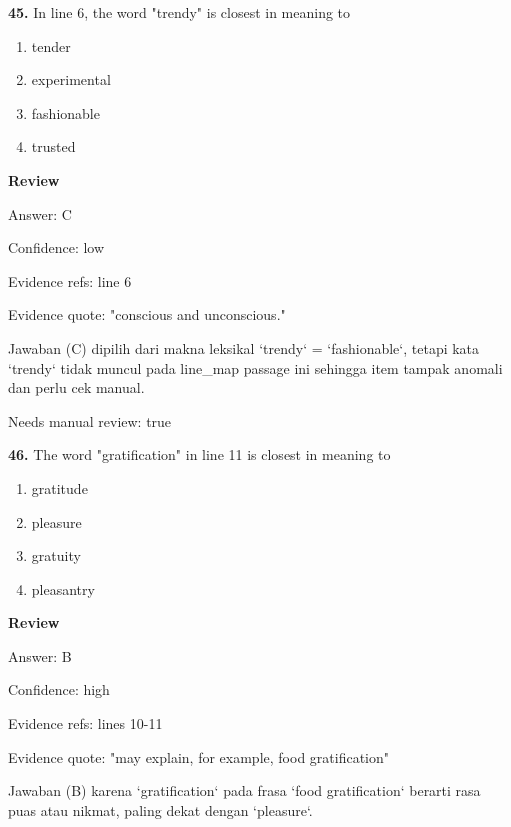 \documentclass[12pt]{article}
\begin{document}
\endgroup
\par
\vspace{0.25\baselineskip}
\noindent\textbf{45.} In line 6, the word "trendy" is closest in meaning to
\begin{enumerate}[label=(\Alph*),leftmargin=*,itemsep=0.2em]
\item tender
\item experimental
\item fashionable
\item trusted
\end{enumerate}
\par
\begingroup
\setlength{\parskip}{0pt}
\setlength{\parindent}{0pt}
\textbf{Review}\par
Answer: C\par
Confidence: low\par
Evidence refs: line 6\par
Evidence quote: "conscious and unconscious."\par
Jawaban (C) dipilih dari makna leksikal `trendy` = `fashionable`, tetapi kata `trendy` tidak muncul pada line\_map passage ini sehingga item tampak anomali dan perlu cek manual.\par
Needs manual review: true\par
\endgroup
\par
\vspace{0.25\baselineskip}
\noindent\textbf{46.} The word "gratification" in line 11 is closest in meaning to
\begin{enumerate}[label=(\Alph*),leftmargin=*,itemsep=0.2em]
\item gratitude
\item pleasure
\item gratuity
\item pleasantry
\end{enumerate}
\par
\begingroup
\setlength{\parskip}{0pt}
\setlength{\parindent}{0pt}
\textbf{Review}\par
Answer: B\par
Confidence: high\par
Evidence refs: lines 10-11\par
Evidence quote: "may explain, for example, food gratification"\par
Jawaban (B) karena `gratification` pada frasa `food gratification` berarti rasa puas atau nikmat, paling dekat dengan `pleasure`.\par
\endgroup
\par
\vspace{0.25\baselineskip}
\end{document}
